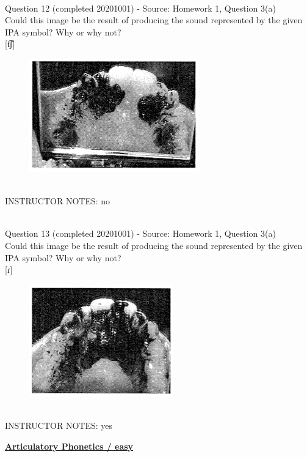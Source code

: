 \documentclass[12pt]{article}
\begin{document}
~\\

{\large Question 12} (completed 20201001) - Source: Homework 1, Question 3(a)\\

Could this image be the result of producing the sound represented by the given IPA symbol? Why or why not?\\

{[t͡ʃ]}

\begin{figure}[H]
\includegraphics{../images/staticpalatography_fricative.png}
\end{figure}

~\\
INSTRUCTOR NOTES: no


~\\

{\large Question 13} (completed 20201001) - Source: Homework 1, Question 3(a)\\

Could this image be the result of producing the sound represented by the given IPA symbol? Why or why not?\\

{[ɾ]}

\begin{figure}[H]
\includegraphics{../images/staticpalatography_stop.png}
\end{figure}

~\\
INSTRUCTOR NOTES: yes


\newpage\textbf{\underline{\huge Articulatory Phonetics / easy\\}}
\end{document}
